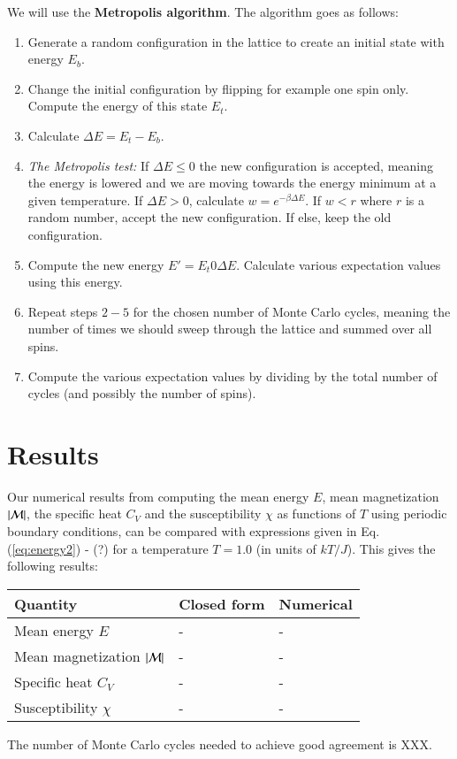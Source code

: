 \documentclass{article}
\begin{document}
\begin{multicols}{2}
We will use the \textbf{Metropolis algorithm}. The algorithm goes as follows:

\begin{enumerate}
	\item Generate a random configuration in the lattice to create an initial state with energy $E_b$.
	\item Change the initial configuration by flipping for example one spin only. Compute the energy of this state $E_t$.
	\item Calculate $\Delta E = E_t - E_b$.
	\item \textit{The Metropolis test:} If $\Delta E \leq 0$ the new configuration is accepted, meaning the energy is lowered and we are moving towards the energy minimum at a given temperature. If $\Delta E > 0$, calculate $w = e^{- \beta \Delta E}$. If $w < r$ where $r$ is a random number, accept the new configuration. If else, keep the old configuration.
	\item Compute the new energy $E' = E_t 0 \Delta E$. Calculate various expectation values using this energy.
	\item Repeat steps $2-5$ for the chosen number of Monte Carlo cycles, meaning the number of times we should sweep through the lattice and summed over all spins.
	\item Compute the various expectation values by dividing by the total number of cycles (and possibly the number of spins).
\end{enumerate}





\section{Results}

Our numerical results from computing the mean energy $E$, mean magnetization $|{\cal M}|$, the specific heat $C_V$ and the susceptibility $\chi$ as functions of $T$ using periodic boundary conditions, can be compared with expressions given in Eq. (\ref{eq:energy2}) - (?) for a temperature $T=1.0$ (in units of $kT/J$). This gives the following results:

\begin{center}
\begin{tabular}{ l l l }\hline
	Quantity 								& Closed form	 				& Numerical		\\ \hline
	Mean energy $E$ 						& - 							& -		 \\
	Mean magnetization $|{\cal M}|$ 			& -							& -		 \\
	Specific heat $C_V$						& -							& - 		\\
	Susceptibility $\chi$						& -							& -		\\
	\hline
\end{tabular}
\end{center}
The number of Monte Carlo cycles needed to achieve good agreement is XXX.


\end{multicols}
\end{document}
